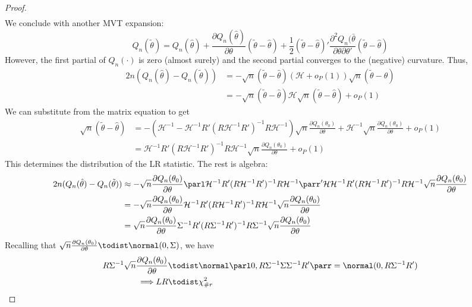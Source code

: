 \documentclass[10pt]{article}
\begin{document}
\begin{proof}
\begin{align*}
	\end{align*}
	We conclude with another MVT expansion:
	\[
	Q_n(\tilde{\theta}) = Q_n(\hat{\theta}) + \frac{\partial Q_n(\hat{\theta})}{\partial \theta} (\tilde{\theta} - \hat{\theta}) + \frac{1}{2}  (\tilde{\theta} - \hat{\theta}) ' \frac{\partial^2 Q_n(\bar{\theta}}{\partial \theta \partial \theta'}  (\tilde{\theta} - \hat{\theta}) 
	\]
	However, the first partial of $Q_n(\cdot)$ is zero (almost surely) and the second partial converges to the (negative) curvature. Thus,
	\begin{align*}
		2n(Q_n(\hat{\theta}) - Q_n(\tilde{\theta})) &= -\sqrt{n}(\tilde{\theta} - \hat{\theta})  (\mathcal{H} + o_P(1)) \sqrt{n} (\tilde{\theta} - \hat{\theta}) \\ &= -\sqrt{n}(\tilde{\theta} - \hat{\theta})  \mathcal{H}\sqrt{n} (\tilde{\theta} - \hat{\theta}) + o_P(1)
	\end{align*}
	We can substitute from the matrix equation to get 
	\begin{align*}
		\sqrt{n} (\tilde{\theta} - \hat{\theta}) &= -(\mathcal{H}^{-1} - \mathcal{H}^{-1}R'(R\mathcal{H}^{-1}R')^{-1}R\mathcal{H}^{-1})\sqrt{n} \frac{\partial Q_n(\theta_0)}{\partial \theta} + \mathcal{H}^{-1}\sqrt{n}\frac{\partial Q_n(\theta_0)}{\partial \theta} + o_P(1) \\
		&= \mathcal{H}^{-1}R'(R\mathcal{H}^{-1}R')^{-1}R\mathcal{H}^{-1}\sqrt{n} \frac{\partial Q_n(\theta_0)}{\partial \theta} + o_P(1)
	\end{align*}
	This determines the distribution of the LR statistic. The rest is algebra:
	\begin{align*}
		2n(Q_n(\hat{\theta}) - Q_n(\tilde{\theta})) &\approx - \sqrt{n} \frac{\partial Q_n(\theta_0)}{\partial \theta}\parl \mathcal{H}^{-1}R'(R\mathcal{H}^{-1}R')^{-1}R\mathcal{H}^{-1}\parr' \mathcal{H} \mathcal{H}^{-1}R'(R\mathcal{H}^{-1}R')^{-1}R\mathcal{H}^{-1} \sqrt{n} \frac{\partial Q_n(\theta_0)}{\partial \theta} \\
		&= - \sqrt{n} \frac{\partial Q_n(\theta_0)}{\partial \theta}  \mathcal{H}^{-1}R'(R\mathcal{H}^{-1}R')^{-1}R\mathcal{H}^{-1} \sqrt{n} \frac{\partial Q_n(\theta_0)}{\partial \theta} \\
		&= \sqrt{n} \frac{\partial Q_n(\theta_0)}{\partial \theta}  \Sigma^{-1}R'(R\Sigma^{-1}R')^{-1}R\Sigma^{-1} \sqrt{n} \frac{\partial Q_n(\theta_0)}{\partial \theta} 
	\end{align*}
	Recalling that $ \sqrt{n} \frac{\partial Q_n(\theta_0)}{\partial \theta} \todist \normal(0,\Sigma)$, we have 
	\begin{align*}
		R\Sigma^{-1} \sqrt{n} \frac{\partial Q_n(\theta_0)}{\partial \theta}  &\todist \normal\parl 0, R\Sigma^{-1} \Sigma \Sigma^{-1} R'\parr = \normal(0,R\Sigma^{-1}R') \\
		\Longrightarrow LR &\todist \chi^2_{\#r}
	\end{align*}
\end{proof}
\end{document}
